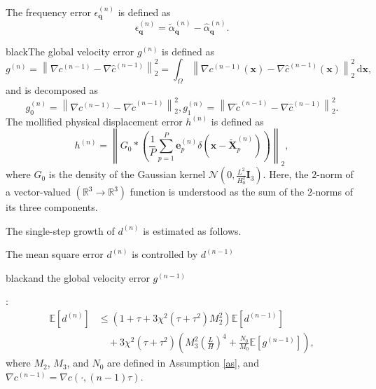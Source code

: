 \documentclass[review,onefignum,onetabnum]{siamart250211}
\begin{document}
\begin{definition}
The frequency error $\epsilon_\mathbf{q}^{(n)}$ is defined as
\begin{equation}
\epsilon_\mathbf{q}^{(n)}=\tilde{\alpha}_\mathbf{q}^{(n)}-\hat{\alpha}_\mathbf{q}^{(n)}.
\end{equation}
\begin{color}{black}The global velocity error $g^{(n)}$ is defined as
\begin{equation}
g^{(n)} = \left\|
\nabla c^{(n-1)}
-
\nabla\hat{c}^{(n-1)}
\right\|_2^2 = \int_\Omega \left\|
\nabla c^{(n-1)} (\mathbf{x})
-
\nabla\hat{c}^{(n-1)}(\mathbf{x})
\right\|_2^2\,\mathrm{d}\mathbf{x},
\end{equation}
and is decomposed as
\begin{equation}
g_0^{(n)} = \left\|
\nabla c^{(n-1)}
-
\nabla\tilde{c}^{(n-1)}
\right\|_2^2,g_1^{(n)} = \left\|
\nabla \tilde{c}^{(n-1)}
-
\nabla\hat{c}^{(n-1)}
\right\|_2^2.
\end{equation}
The mollified physical displacement error $h^{(n)}$ is defined as
\begin{equation}
\label{eq:hs}
h^{(n)} = \left\|G_0 \ast \left(\frac{1}{P}\sum_{p=1}^P\mathbf{e}_p^{(n)}\delta(\mathbf{x} - \widetilde{\mathbf{X}}_p^{(n)})\right)\right\|_2,
\end{equation}
where $G_0$ is the density of the Gaussian kernel $\mathcal N\left(0,\frac{L^2}{H_0^2}\mathbf I_3\right)$. Here, the \(2\)-norm of a vector-valued $(\mathbb{R}^3\to\mathbb{R}^3)$ function is understood as the sum of the \(2\)-norms of its three components.
\end{color}
\end{definition}


The single-step growth of $d^{(n)}$ is estimated as follows.
\begin{lemma}
\label{lem:Gronwall2}
The mean square error \(d^{(n)}\) is controlled by \(d^{(n-1)}\)
\begin{color}{black}and the global velocity error \(g^{(n-1)}\)\end{color}:
\begin{equation}
\label{eq:e03}
\begin{aligned}
\mathbb{E}[d^{(n)}]
&\leq
\left(1+\tau+3\chi^2(\tau+\tau^2)M_2^2\right)
\mathbb{E}[d^{(n-1)}] \\
&\quad
+3\chi^2(\tau+\tau^2)
\left(
M_3^2\left(\frac{L}{H}\right)^4
+\frac{N_0}{M_0}
\mathbb{E}\left[g^{(n-1)}\right]
\right),
\end{aligned}
\end{equation}
where \(M_2\), \(M_3\), and \(N_0\) are defined in
Assumption \ref{as}, and
\(\nabla c^{(n-1)}=\nabla c(\cdot,(n-1)\tau)\).
\end{lemma}
\end{document}
